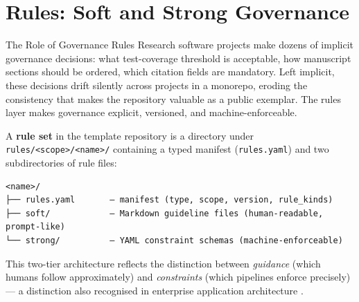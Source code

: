 \documentclass[
  ignorenonframetext,
]{beamer}
\author{\texorpdfstring{}{}}
\date{}
\begin{document}
\section{Rules: Soft and Strong Governance}\label{sec:rules}

\begin{frame}{The Role of Governance Rules}
\protect{}\label{the-role-of-governance-rules}
Research software projects make dozens of implicit governance decisions:
what test-coverage threshold is acceptable, how manuscript sections
should be ordered, which citation fields are mandatory. Left implicit,
these decisions drift silently across projects in a monorepo, eroding
the consistency that makes the repository valuable as a public exemplar.
The rules layer makes governance explicit, versioned, and
machine-enforceable.

A \textbf{rule set} in the template repository is a directory under
\texttt{rules/\textless{}scope\textgreater{}/\textless{}name\textgreater{}/}
containing a typed manifest (\texttt{rules.yaml}) and two subdirectories
of rule files:

\begin{verbatim}
<name>/
├── rules.yaml       — manifest (type, scope, version, rule_kinds)
├── soft/            — Markdown guideline files (human-readable, prompt-like)
└── strong/          — YAML constraint schemas (machine-enforceable)
\end{verbatim}

This two-tier architecture reflects the distinction between
\emph{guidance} (which humans follow approximately) and
\emph{constraints} (which pipelines enforce precisely) --- a distinction
also recognised in enterprise application architecture
.
\end{frame}
\end{document}
